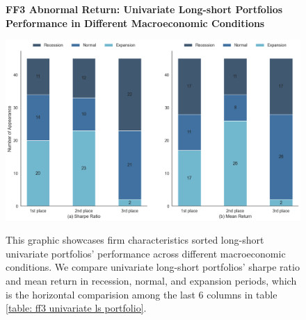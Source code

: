 \begin{figure}[H]
  \centering
  \caption{\textbf{FF3 Abnormal Return: Univariate Long-short Portfolios Performance in Different Macroeconomic Conditions}}
  \includegraphics[width=.8\textwidth]{images/univariant_ls_ff3_comparing.png}
  \label{fig: ff3 univariate ls comparing}
  \caption*{\footnotesize{This graphic showcases firm characteristics sorted long-short univariate portfolios' performance across different macroeconomic conditions. We compare univariate long-short portfolios' sharpe ratio and mean return in recession, normal, and expansion periods, which is the horizontal comparision among the last 6 columns in table \ref{table: ff3 univariate ls portfolio}.}}
\end{figure}

